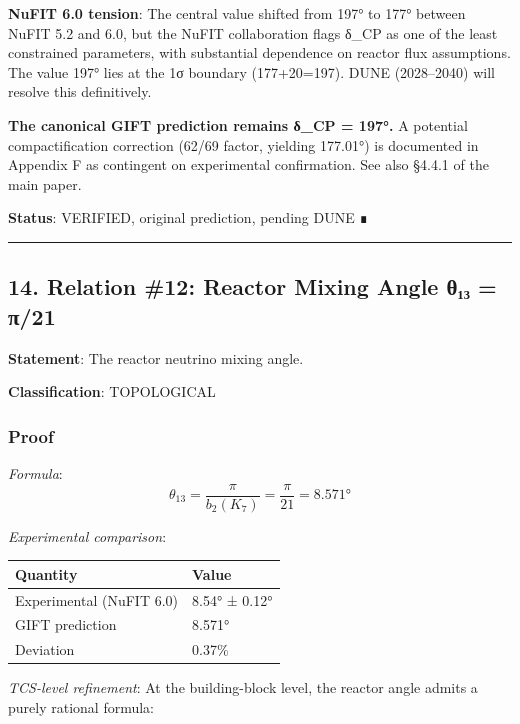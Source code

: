 \documentclass[11pt,a4paper]{article}
\begin{document}
\textbf{NuFIT 6.0 tension}: The central value shifted from 197° to 177° between NuFIT 5.2
and 6.0, but the NuFIT collaboration flags δ\_CP as one of the least constrained
parameters, with substantial dependence on reactor flux assumptions. The value 197°
lies at the 1σ boundary (177+20=197). DUNE (2028--2040) will resolve this definitively.

\textbf{The canonical GIFT prediction remains δ\_CP = 197°.} A potential compactification
correction (62/69 factor, yielding 177.01°) is documented in Appendix F as contingent
on experimental confirmation. See also §4.4.1 of the main paper.

\textbf{Status}: VERIFIED, original prediction, pending DUNE ∎

\begin{center}\rule{0.5\linewidth}{0.5pt}\end{center}

\subsection{14. Relation \#12: Reactor Mixing Angle θ₁₃ = π/21}\label{relation-12-reactor-mixing-angle-ux3b8ux2081ux2083-ux3c021}

\textbf{Statement}: The reactor neutrino mixing angle.

\textbf{Classification}: TOPOLOGICAL

\subsubsection{Proof}\label{proof-16}

\emph{Formula}:
\[\theta_{13} = \frac{\pi}{b_2(K_7)} = \frac{\pi}{21} = 8.571°\]

\emph{Experimental comparison}:

{\def\LTcaptype{none} %
\begin{longtable}[]{@{}ll@{}}
\toprule\noalign{}
Quantity & Value \\
\midrule\noalign{}
\endhead
\bottomrule\noalign{}
\endlastfoot
Experimental (NuFIT 6.0) & 8.54° ± 0.12° \\
GIFT prediction & 8.571° \\
Deviation & 0.37\% \\
\end{longtable}
}

\emph{TCS-level refinement}: At the building-block level, the reactor angle admits a purely rational formula:
\end{document}
